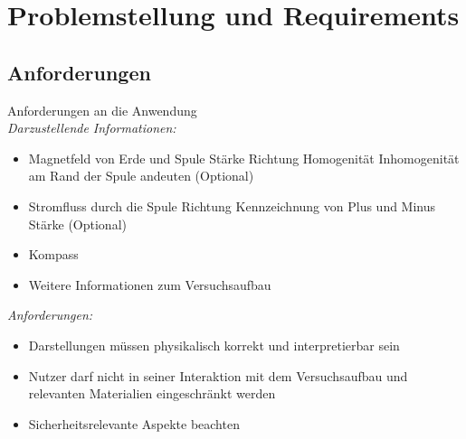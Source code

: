 \section{Problemstellung und Requirements}
\label{sec-3}

\subsection{Anforderungen}
\label{sec-3-1}
Anforderungen an die Anwendung\\

\textit{Darzustellende Informationen:}
\begin{itemize}
	\item Magnetfeld von Erde und Spule
	\subitem Stärke
	\subitem Richtung
	\subitem Homogenität
	\subitem Inhomogenität am Rand der Spule andeuten (Optional)
	\item Stromfluss durch die Spule
	\subitem Richtung
	\subitem Kennzeichnung von Plus und Minus
	\subitem Stärke (Optional)
	\item Kompass
	\item Weitere Informationen zum Versuchsaufbau
\end{itemize}

\textit{Anforderungen:}
\begin{itemize}
	\item Darstellungen müssen physikalisch korrekt und interpretierbar sein
	\item Nutzer darf nicht in seiner Interaktion mit dem Versuchsaufbau und relevanten Materialien eingeschränkt werden
	\item Sicherheitsrelevante Aspekte beachten
\end{itemize}

